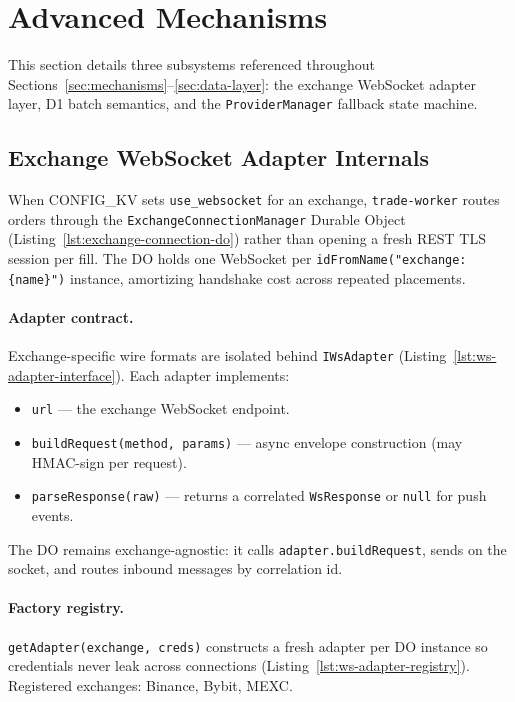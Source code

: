 \section{Advanced Mechanisms}
\label{sec:advanced}

This section details three subsystems referenced throughout Sections~\ref{sec:mechanisms}--\ref{sec:data-layer}: the exchange WebSocket adapter layer, D1 batch semantics, and the \texttt{ProviderManager} fallback state machine.

\subsection{Exchange WebSocket Adapter Internals}

When CONFIG\_KV sets \texttt{use\_websocket} for an exchange, \texttt{trade-worker} routes orders through the \texttt{ExchangeConnectionManager} Durable Object (Listing~\ref{lst:exchange-connection-do}) rather than opening a fresh REST TLS session per fill. The DO holds one WebSocket per \texttt{idFromName("exchange:\{name\}")} instance, amortizing handshake cost across repeated placements.

\paragraph{Adapter contract.} Exchange-specific wire formats are isolated behind \texttt{IWsAdapter} (Listing~\ref{lst:ws-adapter-interface}). Each adapter implements:
\begin{itemize}
  \item \texttt{url} --- the exchange WebSocket endpoint.
  \item \texttt{buildRequest(method, params)} --- async envelope construction (may HMAC-sign per request).
  \item \texttt{parseResponse(raw)} --- returns a correlated \texttt{WsResponse} or \texttt{null} for push events.
\end{itemize}

The DO remains exchange-agnostic: it calls \texttt{adapter.buildRequest}, sends on the socket, and routes inbound messages by correlation id.


\paragraph{Factory registry.} \texttt{getAdapter(exchange, creds)} constructs a fresh adapter per DO instance so credentials never leak across connections (Listing~\ref{lst:ws-adapter-registry}). Registered exchanges: Binance, Bybit, MEXC.

